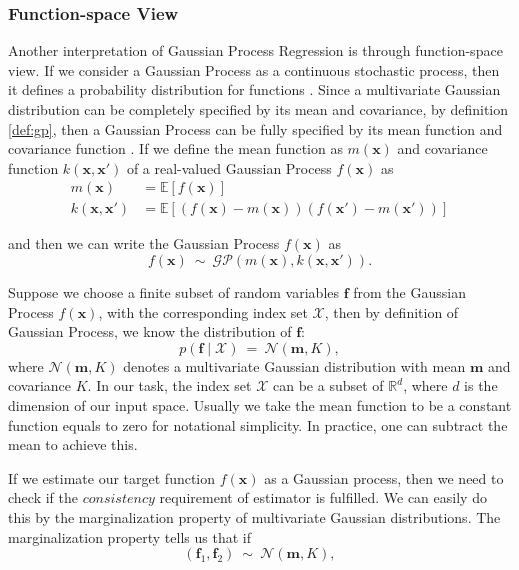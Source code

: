 \documentclass[11pt,a4paper]{article}
\theoremstyle{definition}
\newcommand{\GP}{\mathcal{GP}}
\newcommand{\EE}{\mathbb{E}}
\numberwithin{equation}{section}
\let\vec\mathbf
\begin{document}
	\subsubsection{Function-space View}
	Another interpretation of Gaussian Process Regression is through function-space view. If we consider a Gaussian Process as a continuous stochastic process, then it defines a probability distribution for functions \cite[Papoulis]{Papoulis}. Since a multivariate Gaussian distribution can be completely specified by its mean and covariance, by definition \ref{def:gp}, then a Gaussian Process can be fully specified by its mean function and covariance function \cite[Rasmussen and Williams]{RandW}. If we define the mean function as $m(\vec{x})$ and covariance function $k(\vec{x},\vec{x'})$ of a real-valued Gaussian Process $f(\vec x)$ as
	\begin{equation} \label{}
	\begin{split}
	m(\vec{x}) & = \EE \left[ f(\vec x)\right] \\
	k(\vec{x},\vec{x'}) & = \EE \left[ \left( f(\vec x)-m(\vec{x})\right)\left( f(\vec x')-m(\vec{x'})\right)\right] 
	\end{split}
	\end{equation}
	
	and then we can write the Gaussian Process $f(\vec x)$ as
	\begin{equation} \label{}
	f(\vec x) \  \sim \ \GP\left(m(\vec{x}),k(\vec{x},\vec{x'})  \right).
	\end{equation}
	
	Suppose we choose a finite subset of random variables $\vec f$ from the Gaussian Process $f(\vec x)$, with the corresponding index set $\mathcal X$, then by definition of Gaussian Process, we know the distribution of $\vec f$:
	\begin{equation} \label{}
	p\left(\vec f \mid \mathcal X\right)\ =\ \mathcal N \left(\vec m , K \right),
	\end{equation}
	where $\mathcal N \left(\vec m , K \right)$ denotes a multivariate Gaussian distribution with mean $\vec m$ and covariance $K$. 
	In our task, the index set $\mathcal X$ can be a subset of $\mathbb R ^d$, where $d$ is the dimension of our input space. Usually we take the mean function to be a constant function equals to zero for notational simplicity. In practice, one can subtract the mean to achieve this. 
	
	If we estimate our target function $f(\vec x)$ as a Gaussian process, then we need to check if the $consistency$ requirement of estimator is fulfilled. We can easily do this by the marginalization property of multivariate Gaussian distributions. The marginalization property tells us that if 
	\begin{equation*} \label{}
	\left(\vec f_1, \vec f_2\right)\ \sim \ \mathcal N \left(\vec m , K \right),
	\end{equation*}
	
\end{document}
